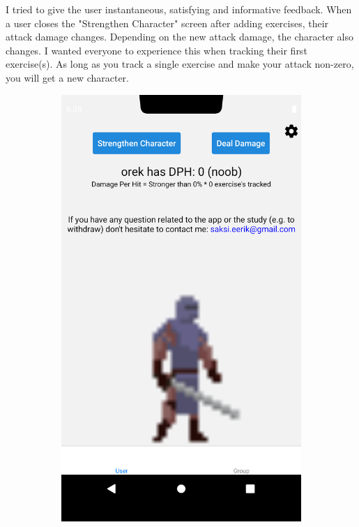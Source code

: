 \documentclass{l4proj}
\begin{document}
I tried to give the user instantaneous, satisfying and informative feedback. When a user closes the "Strengthen Character" screen after adding exercises, their attack damage changes. Depending on the new attack damage, the character also changes. I wanted everyone to experience this when tracking their first exercise(s). As long as you track a single exercise and make your attack non-zero, you will get a new character. 

\begin{figure}[H]
    \begin{subfigure}{0.45\textwidth}
      \includegraphics[width=\textwidth]{noob_user_page.png}    

\end{subfigure}
\end{figure}
\end{document}

